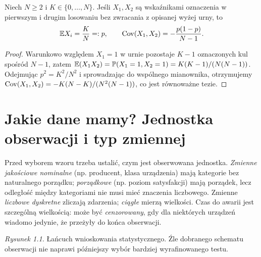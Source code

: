 \begin{stwierdzenie}\label{prop:without-replacement-cov}
Niech $N\ge2$ i $K\in\{0,\ldots,N\}$. Jeśli $X_1,X_2$ są wskaźnikami oznaczenia w pierwszym i drugim losowaniu bez zwracania z opisanej wyżej urny, to
\[
\mathbb E X_i=\frac KN=:p,\qquad
\operatorname{Cov}(X_1,X_2)=-\frac{p(1-p)}{N-1}.
\]
\end{stwierdzenie}
\begin{proof}
Warunkowo względem $X_1=1$ w urnie pozostaje $K-1$ oznaczonych kul spośród $N-1$, zatem $\mathbb E(X_1X_2)=\mathbb P(X_1=1,X_2=1)=K(K-1)/(N(N-1))$. Odejmując $p^2=K^2/N^2$ i sprowadzając do wspólnego mianownika, otrzymujemy
$\operatorname{Cov}(X_1,X_2)=-K(N-K)/(N^2(N-1))$, co jest równoważne tezie.
\end{proof}

\section{Jakie dane mamy? Jednostka obserwacji i typ zmiennej}
Przed wyborem wzoru trzeba ustalić, czym jest obserwowana jednostka. \emph{Zmienne jakościowe nominalne} (np. producent, klasa urządzenia) mają kategorie bez naturalnego porządku; \emph{porządkowe} (np. poziom satysfakcji) mają porządek, lecz odległość między kategoriami nie musi mieć znaczenia liczbowego. Zmienne \emph{liczbowe dyskretne} zliczają zdarzenia; \emph{ciągłe} mierzą wielkości. Czas do awarii jest szczególną wielkością: może być \emph{cenzorowany}, gdy dla niektórych urządzeń wiadomo jedynie, że przeżyły do końca obserwacji.

\begin{center}
\end{center}
\noindent\emph{Rysunek 1.1.} Łańcuch wnioskowania statystycznego. Źle dobranego schematu obserwacji nie naprawi późniejszy wybór bardziej wyrafinowanego testu.

